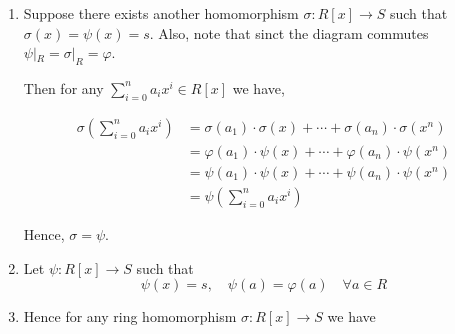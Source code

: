 \documentclass[Notebook.tex]{subfiles}
\begin{document}
\begin{solution}
    \bbni

    \begin{enumerate}[label=(\alph*),ref=\theenumi\alph*]
        \item Suppose there exists another homomorphism $\sigma: R[x] \to S$ such that $\sigma(x) = \psi(x) = s$. Also, note that sinct the diagram commutes $\psi|_R = \sigma|_R = \varphi$. 
        
        Then for any $\sum_{i=0}^n a_ix^i \in R[x]$ we have,

        \begin{align*}
            \sigma \left(\sum_{i=0}^n a_ix^i\right) &= \sigma(a_1)\cdot\sigma(x) + \cdots + \sigma(a_n)\cdot\sigma(x^n) \\
            &= \varphi(a_1)\cdot\psi(x) + \cdots + \varphi(a_n)\cdot\psi(x^n) \\
            &= \psi(a_1)\cdot\psi(x) + \cdots + \psi(a_n)\cdot\psi(x^n) \\
            &= \psi \left(\sum_{i=0}^n a_ix^i\right)
        \end{align*}
        
        Hence, $\sigma = \psi$. 

        \item Let $\psi: R[x] \to S$ such that 
        \[ \psi(x) = s, \quad \psi(a) = \varphi(a) \quad \forall a \in R\]

        \item Hence for any ring homomorphism $\sigma: R[x] \to S$ we have 
        \begin{center}
        \end{center}
    \end{enumerate}
\end{solution}


\newpage 
\end{document}
